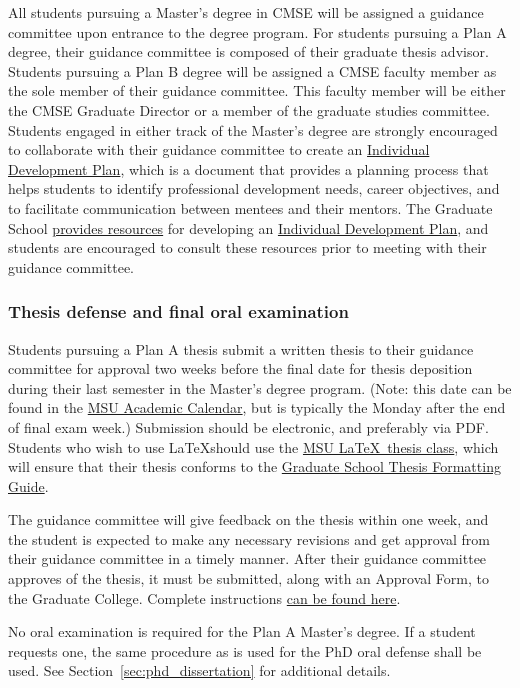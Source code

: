 All students pursuing a Master's degree in CMSE will be assigned a
guidance committee upon entrance to the degree program.  For students
pursuing a Plan A degree, their guidance committee is composed of
their graduate thesis advisor.  Students pursuing a Plan B degree will
be assigned a CMSE faculty member as the sole member of their guidance
committee.  This faculty member will be either the CMSE Graduate
Director or a member of the graduate studies committee.  Students
engaged in either track of the Master's degree are strongly encouraged
to collaborate with their guidance committee to create an
\href{http://caffe.grd.msu.edu/IDP}{Individual Development Plan},
which is a document that provides a planning process that helps
students to identify professional development needs, career
objectives, and to facilitate communication between mentees and their
mentors.  The Graduate School
\href{https://grad.msu.edu/prep}{provides resources} for developing an
\href{http://caffe.grd.msu.edu/IDP}{Individual Development Plan}, and
students are encouraged to consult these resources prior to meeting
with their guidance committee.

\subsubsection{Thesis defense and final oral examination}

Students pursuing a Plan A thesis submit a written thesis to their
guidance committee for approval two weeks before the final date for
thesis deposition during their last semester in the Master's degree
program.  (Note: this date can be found in the
\href{https://reg.msu.edu/ROInfo/Calendar/Academic.aspx}{MSU Academic
Calendar}, but is typically the Monday after the end of final exam
week.)  Submission should be electronic, and preferably via PDF.
Students who wish to use \LaTeX should use the
\href{http://ctan.org/pkg/msu-thesis}{MSU \LaTeX\ thesis class}, which
will ensure that their thesis conforms to the
\href{https://grad.msu.edu/etd/formatting-guide}{Graduate School
Thesis Formatting Guide}.

The guidance committee will give feedback on the thesis within one
week, and the student is expected to make any necessary revisions and
get approval from their guidance committee in a timely manner.  After
their guidance committee approves of the thesis, it must be submitted,
along with an Approval Form, to the Graduate College.  Complete
instructions \href{https://grad.msu.edu/etd}{can be found here}.

No oral examination is required for the Plan A Master's degree.  If a
student requests one, the same procedure as is used for the PhD oral
defense shall be used.  See Section~\ref{sec:phd_dissertation} for
additional details.